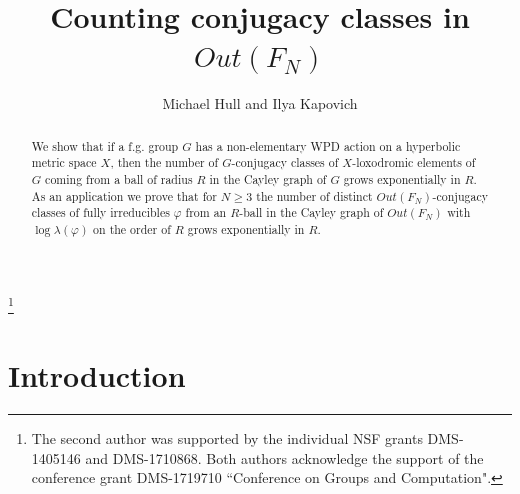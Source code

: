 \documentclass[11pt,letterpaper]{amsart}
\theoremstyle{definition}
\theoremstyle{remark}
\renewcommand{\phi}{\varphi}
\begin{document}
\title{Counting conjugacy classes in $Out(F_N)$}

\author{Michael Hull and Ilya Kapovich}

\address{\tt
Department of Mathematics,
PO Box 118105,
University of Florida,
Gainesville, FL 32611-8105
\newline
https://people.clas.ufl.edu/mbhull/ }

\address{\tt Department of Mathematics, University of Illinois at
  Urbana-Champaign, 1409 West Green Street, Urbana, IL 61801, USA
  \newline http://www.math.uiuc.edu/\~{}kapovich/} 

\thanks{The second author was supported by the individual NSF
  grants DMS-1405146 and DMS-1710868. Both authors acknowledge the support of the conference grant DMS-1719710 ``Conference on Groups and Computation".}



\date{}
\maketitle

\begin{abstract}
We show that if a f.g. group $G$ has a non-elementary WPD action on a hyperbolic metric space $X$, then the number of $G$-conjugacy classes of $X$-loxodromic elements of $G$ coming from a ball of radius $R$ in the Cayley graph of $G$ grows exponentially in $R$. As an application we prove that for $N\ge 3$ the number of distinct $Out(F_N)$-conjugacy classes of fully irreducibles $\phi$ from an $R$-ball in the Cayley graph of $Out(F_N)$ with $\log\lambda(\phi)$ on the order of $R$ grows exponentially in $R$. 
\end{abstract}





\section{Introduction}
\end{document}
